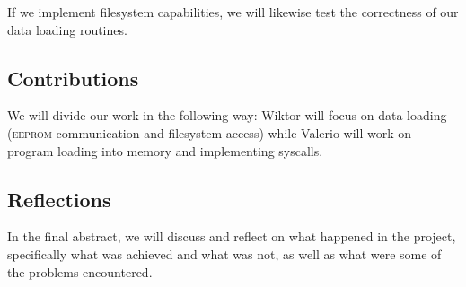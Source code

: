 \documentclass[a4paper, 11pt]{article}
\newcommand*\eeprom{\textsc{eeprom}}
\begin{document}
If we implement filesystem capabilities,
we will likewise test the correctness of our data loading routines.

\subsection{Contributions}
We will divide our work in the following way: Wiktor will focus on data loading (\eeprom{} communication and filesystem access) while Valerio will work on program loading into memory and implementing syscalls.

\subsection{Reflections}
In the final abstract, we will discuss and reflect on what happened in the project, specifically what was achieved and what was not, as well as what were some of the problems encountered.
\end{document}
